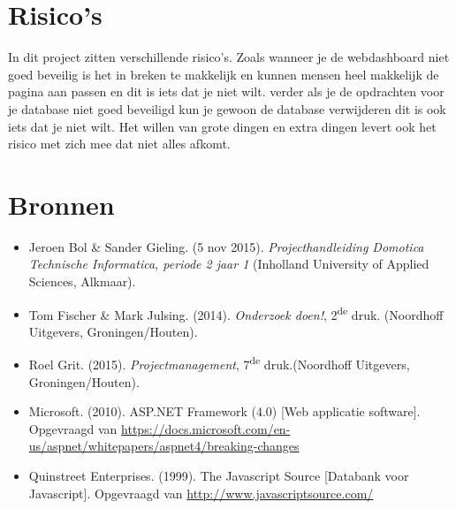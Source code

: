 \documentclass[11pt]{article}
\begin{document}
\section{Risico's}
In dit project zitten verschillende risico's. Zoals wanneer je de webdashboard niet goed beveilig is het in breken te makkelijk en kunnen mensen heel makkelijk de pagina aan passen en dit is iets dat je niet wilt. verder als je de opdrachten voor je database niet goed beveiligd kun je gewoon de database verwijderen dit is ook iets dat je niet wilt. Het willen van grote dingen en extra dingen levert ook het risico met zich mee dat niet alles afkomt.
\newline
\newline
\section{Bronnen}
\begin{itemize}
	\item Jeroen Bol \& Sander Gieling. (5 nov 2015). \textit{Projecthandleiding Domotica Technische Informatica, periode 2 jaar 1} (Inholland University of Applied Sciences, Alkmaar).  
	\item Tom Fischer \& Mark Julsing. (2014). \textit{Onderzoek doen!}, 2\textsuperscript{de} druk. (Noordhoff Uitgevers, Groningen/Houten).
	\item Roel Grit. (2015). \textit{Projectmanagement}, 7\textsuperscript{de} druk.(Noordhoff Uitgevers, Groningen/Houten).
	\item Microsoft. (2010). ASP.NET Framework (4.0) [Web applicatie software]. Opgevraagd van \url{https://docs.microsoft.com/en-us/aspnet/whitepapers/aspnet4/breaking-changes}
	\item Quinstreet Enterprises. (1999). The Javascript Source [Databank voor Javascript]. Opgevraagd van \url{http://www.javascriptsource.com/}
\end{itemize}
\end{document}
